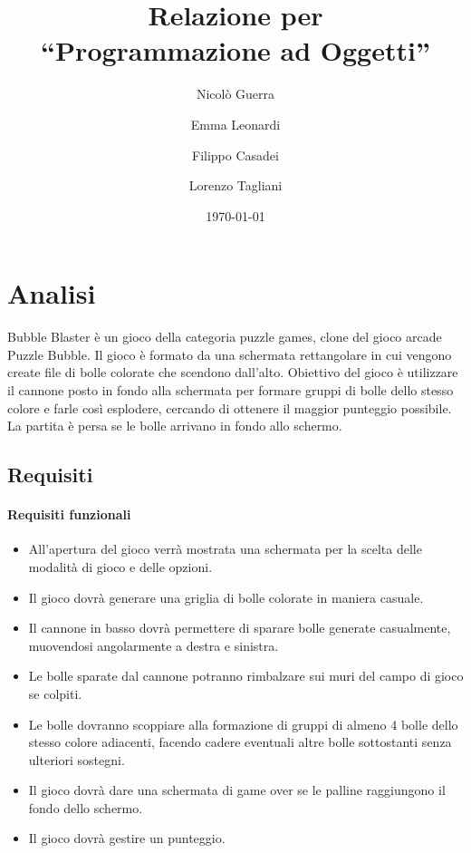 \documentclass[a4paper,12pt]{report}
\title{Relazione per\\``Programmazione ad Oggetti''}
\author{Nicolò Guerra \and
Emma Leonardi \and 
Filippo Casadei \and
Lorenzo Tagliani}
\date{\today}
\begin{document}
 

\maketitle

\tableofcontents

\chapter{Analisi}

Bubble Blaster è un gioco della categoria puzzle games, clone del gioco arcade Puzzle Bubble. Il gioco è formato da una schermata
rettangolare in cui vengono create file di bolle colorate che scendono dall'alto. Obiettivo del gioco è utilizzare il cannone
posto in fondo alla schermata per formare gruppi di bolle dello stesso colore e farle così esplodere, cercando di ottenere il maggior
punteggio possibile. La partita è persa se le bolle arrivano in fondo allo schermo.

\section{Requisiti}

\subsubsection{Requisiti funzionali}
\begin{itemize}
	\item All'apertura del gioco verrà mostrata una schermata per la scelta delle modalità di gioco e delle opzioni.
	\item Il gioco dovrà generare una griglia di bolle colorate in maniera casuale.
	\item Il cannone in basso dovrà permettere di sparare bolle generate casualmente, muovendosi angolarmente a destra e sinistra.
	\item Le bolle sparate dal cannone potranno rimbalzare sui muri del campo di gioco se colpiti.
	\item Le bolle dovranno scoppiare alla formazione di gruppi di almeno 4 bolle dello stesso colore adiacenti, facendo cadere eventuali altre bolle sottostanti senza ulteriori sostegni.
	\item Il gioco dovrà dare una schermata di game over se le palline raggiungono il fondo dello schermo.
	\item Il gioco dovrà gestire un punteggio.
\end{itemize}
\end{document}
